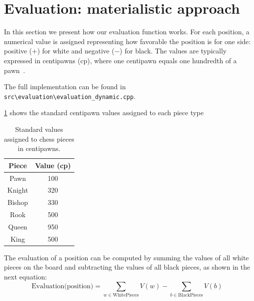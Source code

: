 \section{Evaluation: materialistic approach}\label{sec:evaluation}

In this section we present how our evaluation function works. For each position, a numerical value is assigned representing how favorable the position is for one side: positive ($+$) for white and negative ($-$) for black. The values are typically expressed in centipawns (cp), where one centipawn equals one hundredth of a pawn~\cite{Shannon1950}.

\vspace{1em}

\noindent \parbox{\textwidth}{The full implementation can be found in \texttt{src\textbackslash{}evaluation\textbackslash{}evaluation\_dynamic.cpp}.}

\vspace{1em}

\noindent\cref{tab:values} shows the standard centipawn values assigned to each piece type

\vspace{1em}

\begin{table}
    \centering
    \begin{tabular}{|c|c|}
        \hline
        Piece & Value (cp)\\ \hline
        Pawn & 100 \\ \hline
        Knight & 320 \\ \hline
        Bishop & 330 \\ \hline
        Rook & 500 \\ \hline
        Queen & 950 \\ \hline
        King & 500 \\ \hline
    \end{tabular}
    \caption{Standard values assigned to chess pieces in centipawns.}\label{tab:values}
\end{table}

\noindent The evaluation of a position can be computed by summing the values of all white pieces on the board and subtracting the values of all black pieces, as shown in the next equation:
\begin{equation*}
    \text{Evaluation(position)} = \sum_{w \in \text{WhitePieces}} V(w) - \sum_{b \in \text{BlackPieces}} V(b)
\end{equation*}


